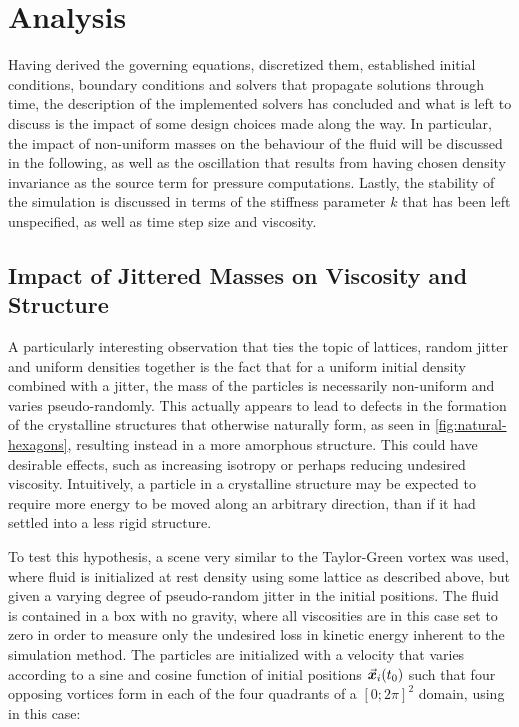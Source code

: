 
\chapter{Analysis}\label{chp:analysis}

Having derived the governing equations, discretized them, established initial conditions, boundary conditions and solvers that propagate solutions through time, the description of the implemented solvers has concluded and what is left to discuss is the impact of some design choices made along the way. In particular, the impact of non-uniform masses on the behaviour of the fluid will be discussed in the following, as well as the oscillation that results from having chosen density invariance as the source term for pressure computations. Lastly, the stability of the simulation is discussed in terms of the stiffness parameter $k$ that has been left unspecified, as well as time step size and viscosity.


\section{Impact of Jittered Masses on Viscosity and Structure}

A particularly interesting observation that ties the topic of lattices, random jitter and uniform densities together is the fact that for a uniform initial density combined with a jitter, the mass of the particles is necessarily non-uniform and varies pseudo-randomly. This actually appears to lead to defects in the formation of the crystalline structures that otherwise naturally form, as seen in \autoref{fig:natural-hexagons}, resulting instead in a more amorphous structure. This could have desirable effects, such as increasing isotropy or perhaps reducing undesired viscosity. Intuitively, a particle in a crystalline structure may be expected to require more energy to be moved along an arbitrary direction, than if it had settled into a less rigid structure.

To test this hypothesis, a scene very similar to the Taylor-Green vortex was used, where fluid is initialized at rest density using some lattice as described above, but given a varying degree of pseudo-random jitter in the initial positions. The fluid is contained in a box with no gravity, where all viscosities are in this case set to zero in order to measure only the undesired loss in kinetic energy inherent to the simulation method. The particles are initialized with a velocity that varies according to a sine and cosine function of initial positions $\vec{\bm{x}}_i(t_0)$ such that four opposing vortices form in each of the four quadrants of a $[0;2\pi]^2$ domain, using in this case\autocite*{taylor-green-arxiv}:

